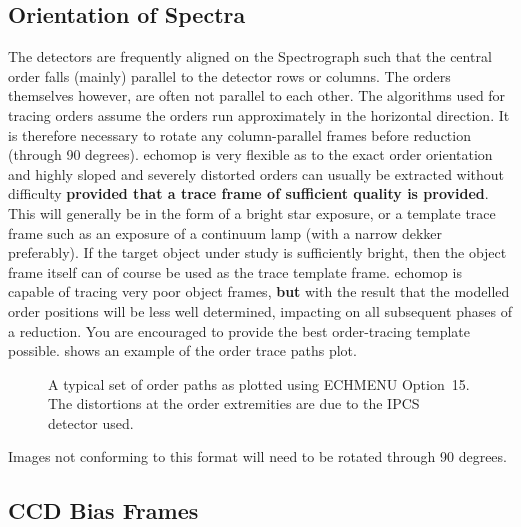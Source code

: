 \subsection{Orientation of Spectra}

The detectors are frequently aligned on the Spectrograph such that the
central order falls (mainly) parallel to the detector rows or columns.
The orders themselves however, are often not parallel to each other.
The algorithms used for tracing orders assume the orders run
approximately in the horizontal direction.  It is therefore necessary to
rotate any column-parallel frames before reduction (through 90 degrees).
 {\sc echomop} is very flexible as to the exact
order orientation and highly sloped and severely distorted orders can
usually be extracted without difficulty {\bf provided that a trace
frame of sufficient quality is provided}.  This will generally be in the
form of a bright star exposure, or a template trace frame such as an
exposure of a continuum lamp (with a narrow dekker preferably).
  If the target object under study is
sufficiently bright, then the object frame itself can of course be used
as the trace template frame.  {\sc echomop} is capable of tracing very poor
object frames, {\bf but} with the result that the modelled order positions
will be less well determined, impacting on all subsequent phases of a
reduction.   You are encouraged to provide the best
order-tracing template possible.  shows an example of the order trace paths plot.

\begin{htmlonly}
\begin{figure}
\begin{center}
{\leavevmode\epsfysize=136mm}

\parbox{140mm}{
\caption{A typical set of order paths as plotted using ECHMENU Option~15.
The distortions at the order extremities are due to the IPCS detector used.}
\label{fi_order2}
}
\end{center}
\end{figure}
\end{htmlonly}

Images not conforming to this format will need to be rotated through 90
degrees.

\subsection{CCD Bias Frames}


